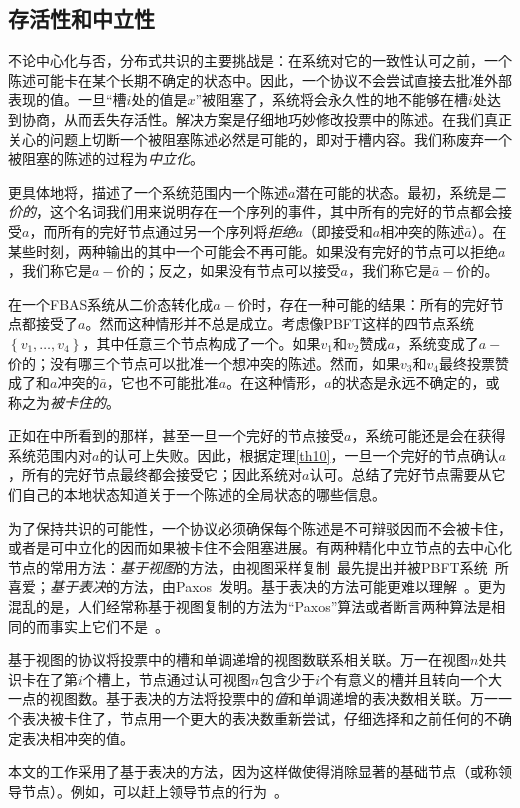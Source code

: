 \subsection{存活性和中立性}\label{sec:vote_stuck}

不论中心化与否，分布式共识的主要挑战是：在系统对它的一致性认可之前，一个陈述可能卡在某个长期不确定的状态中。因此，一个协议不会尝试直接去批准外部表现的值。一旦``槽$i$处的值是$x$''被阻塞了，系统将会永久性的地不能够在槽$i$处达到协商，从而丢失存活性。解决方案是仔细地巧妙修改投票中的陈述。在我们真正关心的问题上切断一个被阻塞陈述必然是可能的，即对于槽内容。我们称废弃一个被阻塞的陈述的过程为\textit{中立化}。

更具体地将，描述了一个系统范围内一个陈述$a$潜在可能的状态。最初，系统是\textit{二价的}，这个名词我们用来说明存在一个序列的事件，其中所有的完好的节点都会接受$a$，而所有的完好节点通过另一个序列将\textit{拒绝}$a$（即接受和$a$相冲突的陈述$\bar a$）。在某些时刻，两种输出的其中一个可能会不再可能。如果没有完好的节点可以拒绝$a$，我们称它是$a-$价的；反之，如果没有节点可以接受$a$，我们称它是$\bar a-$价的。

在一个FBAS系统从二价态转化成$a-\!\!$价时，存在一种可能的结果：所有的完好节点都接受了$a$。然而这种情形并不总是成立。考虑像PBFT这样的四节点系统$\left\{v_1,\ldots,v_4\right\}$，其中任意三个节点构成了一个{\quorum}。如果$v_1$和$v_2$赞成$a$，系统变成了$a-\!\!$价的；没有哪三个节点可以批准一个想冲突的陈述。然而，如果$v_3$和$v_4$最终投票赞成了和$a$冲突的$\bar a$，它也不可能批准$a$。在这种情形，$a$的状态是永远不确定的，或称之为\textit{被卡住的}。

正如在中所看到的那样，甚至一旦一个完好的节点接受$a$，系统可能还是会在获得系统范围内对$a$的认可上失败。因此，根据定理\ref{th10}，一旦一个完好的节点确认$a$，所有的完好节点最终都会接受它；因此系统对$a$认可。总结了完好节点需要从它们自己的本地状态知道关于一个陈述的全局状态的哪些信息。

为了保持共识的可能性，一个协议必须确保每个陈述是不可辩驳因而不会被卡住，或者是可中立化的因而如果被卡住不会阻塞进展。有两种精化中立节点的去中心化节点的常用方法：\textit{基于视图}的方法，由视图采样复制~\cite{Oki:1988:VRN:62546.62549}最先提出并被PBFT系统~\cite{Castro:1999:PBFT}所喜爱；\textit{基于表决}的方法，由Paxos~\cite{Lamport:1998:PP:279227.279229}发明。基于表决的方法可能更难以理解~\cite{Ongaro:2014:SUC:2643634.2643666}。更为混乱的是，人们经常称基于视图复制的方法为``Paxos''算法或者断言两种算法是相同的而事实上它们不是~\cite{6894199}。

基于视图的协议将投票中的槽和单调递增的视图数联系相关联。万一在视图$n$处共识卡在了第$i$个槽上，节点通过认可视图$n$包含少于$i$个有意义的槽并且转向一个大一点的视图数。基于表决的方法将投票中的\textit{值}和单调递增的表决数相关联。万一一个表决被卡住了，节点用一个更大的表决数重新尝试，仔细选择和之前任何的不确定表决相冲突的值。

本文的工作采用了基于表决的方法，因为这样做使得消除显著的基础节点（或称领导节点）。例如，可以赶上领导节点的行为~\cite{Lamport:2011:BPR:2075029.2075058}。
